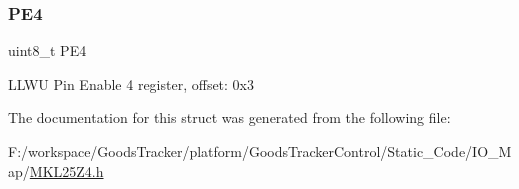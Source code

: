 \subsubsection{\texorpdfstring{P\+E4}{PE4}}
{\footnotesize\ttfamily uint8\+\_\+t P\+E4}

L\+L\+WU Pin Enable 4 register, offset\+: 0x3 

The documentation for this struct was generated from the following file\+:\begin{DoxyCompactItemize}
\item 
F\+:/workspace/\+Goods\+Tracker/platform/\+Goods\+Tracker\+Control/\+Static\+\_\+\+Code/\+I\+O\+\_\+\+Map/\hyperlink{_m_k_l25_z4_8h}{M\+K\+L25\+Z4.\+h}\end{DoxyCompactItemize}
